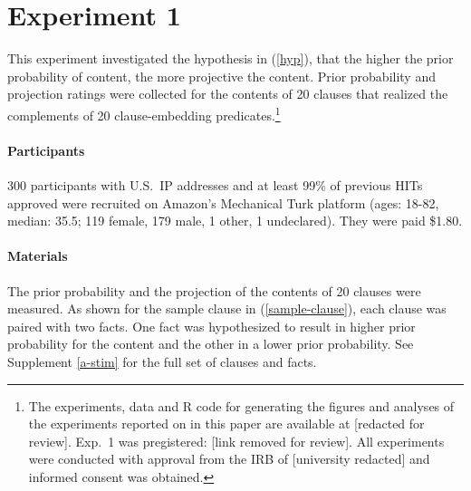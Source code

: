 \documentclass[11pt,fleqn]{article}
\newcommand{\jt}[1]{\textbf{\color{blue}JT: #1}}
\newcommand{\6}{\mbox{$[\hspace*{-.6mm}[$}}
\newcommand{\9}{\mbox{$]\hspace*{-.6mm}]$}}
\begin{document}


\section{Experiment 1}\label{s2}

This experiment investigated the hypothesis in (\ref{hyp}), that the higher the prior probability of content, the more projective the content. Prior probability and projection ratings were collected for the contents of 20 clauses that realized the complements of 20 clause-embedding predicates.\footnote{\label{f-github}The experiments, data and R code for generating the figures and analyses of the experiments reported on in this paper are available at [redacted for review]. Exp.~1 was pregistered: [link removed for review]. All experiments were conducted with approval from the IRB of [university redacted] and informed consent was obtained.}

\paragraph{Participants} 300 participants with U.S.\ IP addresses and at least 99\% of previous HITs approved were recruited on Amazon's Mechanical Turk platform (ages: 18-82, median: 35.5; 119 female, 179 male, 1 other, 1 undeclared). They were paid \$1.80.

\paragraph{Materials} The prior probability and the projection of the contents of 20 clauses were measured. As shown for the sample clause in (\ref{sample-clause}), each clause was paired with two facts. One fact was hypothesized to result in higher prior probability for the content  and the other in a lower prior probability. See Supplement \ref{a-stim} for the full set of clauses and facts. 
\end{document}
